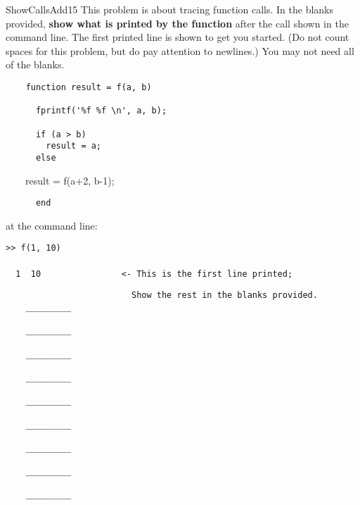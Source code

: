 \documentclass[master]{exam}
\begin{document}
\begin{problem}[require=careful]{ShowCallsAdd}{15}
    This problem is about tracing function calls. In the blanks provided,
    \textbf{show what is printed by the function} after the call shown in the
    command line. The first printed line is shown to get you started. (Do not count spaces for this problem, but do pay attention to newlines.) You may not need all of the blanks.
    \begin{verbatim}
    function result = f(a, b)
      
      fprintf('%f %f \n', a, b);
      
      if (a > b)
        result = a;
      else\end{verbatim}
    \ \ \ \ result = f(a+2, b-1);
    \begin{verbatim}
      end
    \end{verbatim}

    at the command line:

    \texttt{>> f(1, 10)\\
    \\%
    \ \ 1 \ 10\ \ \ \ \ \ \ \ \ \ \ \ \ \ \ \ <- This is the first line printed;}
    \begin{verbatim}
                         Show the rest in the blanks provided.
    _________

    _________

    _________

    _________

    _________

    _________

    _________

    _________

    _________
    \end{verbatim}
\end{problem}
\end{document}
